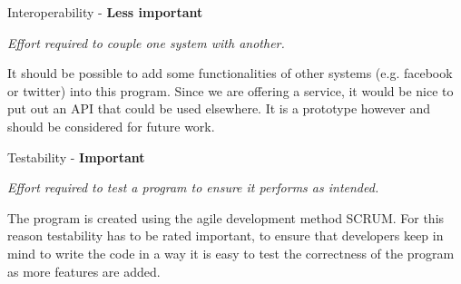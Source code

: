 \vspace{5 mm}
\noindent
Interoperability - \textbf{Less important}

\vspace{5 mm}
\noindent
\textit{Effort required to couple one system with another.}

\vspace{5 mm}
\noindent
It should be possible to add some functionalities of other systems (e.g. facebook or
twitter) into this program. Since we are offering a service, it would be nice to put out an
API that could be used elsewhere. It is a prototype however and should be considered for
future work.

\vspace{5 mm}
\noindent
Testability - \textbf{Important}

\vspace{5 mm}
\noindent
\textit{Effort required to test a program to ensure it performs as intended.}

\vspace{5 mm}
\noindent
The program is created using the agile development method SCRUM. For this reason
testability has to be rated important, to ensure that developers keep in mind to write the
code in a way it is easy to test the correctness of the program as more features are added.